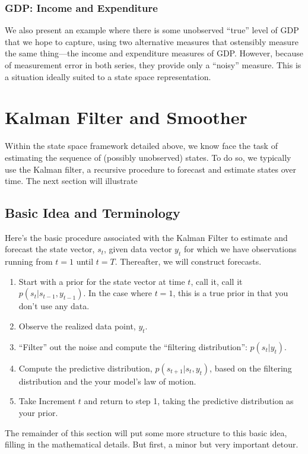 \documentclass[a4paper,12pt]{article}
\begin{document}
\subsubsection{GDP: Income and Expenditure}
We also present an example where there is some unobserved ``true'' level of GDP that we hope to capture, using two alternative measures that ostensibly measure the same thing---the income and expenditure measures of GDP. However, because of measurement error in both series, they provide only a ``noisy'' measure. This is a situation ideally suited to a state space representation.


\newpage
\section{Kalman Filter and Smoother}

Within the state space framework detailed above, we know face the task of estimating the sequence of (possibly unobserved) states. To do so, we typically use the Kalman filter, a recursive procedure to forecast and estimate states over time. The next section will illustrate 

\subsection{Basic Idea and Terminology}

Here's the basic procedure associated with the Kalman
Filter to estimate and forecast the state vector, $s_t$, given data vector $y_t$ for which we have observations running from $t=1$ until $t=T$. Thereafter, we will construct forecasts.
\begin{enumerate}
\item Start with a prior for the state vector at time $t$, call it, call it $p(s_t | s_{t-1}, y_{t-1})$. In the case where $t=1$, this is a true prior in that you don't use any data. 
\item Observe the realized data point, $y_t$. 
\item ``Filter'' out the noise and compute the ``filtering distribution'': $p(s_t | y_t)$.
\item Compute the predictive distribution, $p(s_{t+1} | s_t, y_t)$, based on the filtering distribution and the your model's law of motion. 
\item Take Increment $t$ and return to step 1, taking
the predictive distribution as your prior.
\end{enumerate} The remainder of this section will put some more structure to this basic idea, filling in the mathematical details. But first, a minor but very important detour.
\end{document}
